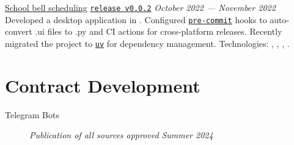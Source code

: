 \documentclass[margin,line]{resume}
\begin{document}
\begin{resume}
\begin{description}
      \vspace{3mm}

    \item[SchoolRing]\small{\href{https://github.com/alchemmist/school-ring}{School
        bell scheduling} \begingroup
        \hypersetup{urlcolor=linkcolor!30}
        \href{https://github.com/}{\texttt{release v0.0.2}}
        \endgroup
        \hfill
      \textsl{October 2022 — November 2022}\vspace{1mm}}\\
      Developed a desktop application in .
      Configured \href{https://github.com}{\texttt{pre-commit}} hooks
      to auto-convert .ui files to .py and CI actions for
      cross-platform releases. Recently migrated the project to
      \href{https://astral.sh/blog/uv}{\texttt{uv}} for dependency
      management. Technologies: ,
      , , .

  \end{description}

  \section{\mysidestyle Contract Development}\vspace{2mm}

  \begin{description}
    \item[Telegram Bots]\small{
        \begingroup
        \textcolor{gray!40}{\textit{Publication of all sources approved}}
        \endgroup
      }{\hfill
      \textsl{Summer 2024}}\vspace{2mm}
\end{description}
\end{resume}
\end{document}
